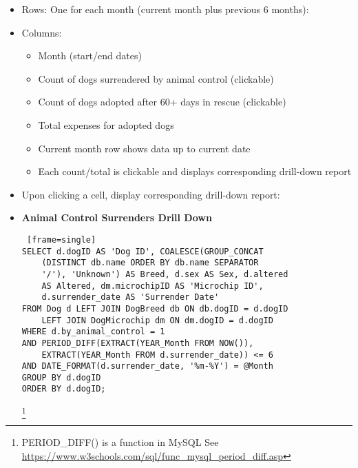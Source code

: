 \documentclass{article}
\begin{document}
\begin{itemize}
\begin{itemize}
    \footnote{DATE\_FORMAT() is a function in MySQL See \url{https://www.w3schools.com/sql/func_mysql_date_format.asp}}
    \footnote{PERIOD\_DIFF() is a function in MySQL See \url{https://www.w3schools.com/sql/func_mysql_period_diff.asp}}
    \footnote{calendar is a recursive object to create the month year dates in scope. If a month year in scope does not exist in the database, the calendar object inserts it with 0s for all fields \url{https://dev.mysql.com/doc/refman/8.4/en/with.html##common-table-expressions-recursive-date-series}}
    \item Rows: One for each month (current month plus previous 6 months):
    \item Columns:
    \begin{itemize}
        \item Month (start/end dates)
        \item Count of dogs surrendered by animal control (clickable)
        \item Count of dogs adopted after 60+ days in rescue (clickable)
        \item Total expenses for adopted dogs
        \item Current month row shows data up to current date
        \item Each count/total is clickable and displays corresponding drill-down report
    \end{itemize}
    \item Upon clicking a cell, display corresponding drill-down report:
\end{itemize} 
\newpage
    \begin{itemize}
        \item \textbf{Animal Control Surrenders Drill Down}
        \begin{Verbatim} [frame=single]
SELECT d.dogID AS 'Dog ID', COALESCE(GROUP_CONCAT
    (DISTINCT db.name ORDER BY db.name SEPARATOR 
    '/'), 'Unknown') AS Breed, d.sex AS Sex, d.altered 
    AS Altered, dm.microchipID AS 'Microchip ID', 
    d.surrender_date AS 'Surrender Date'
FROM Dog d LEFT JOIN DogBreed db ON db.dogID = d.dogID 
    LEFT JOIN DogMicrochip dm ON dm.dogID = d.dogID
WHERE d.by_animal_control = 1
AND PERIOD_DIFF(EXTRACT(YEAR_Month FROM NOW()), 
    EXTRACT(YEAR_Month FROM d.surrender_date)) <= 6
AND DATE_FORMAT(d.surrender_date, '%m-%Y') = @Month
GROUP BY d.dogID
ORDER BY d.dogID;
        \end{Verbatim}
        \footnote{PERIOD\_DIFF() is a function in MySQL See \url{https://www.w3schools.com/sql/func_mysql_period_diff.asp}}

\end{itemize}
\end{itemize}
\end{document}
